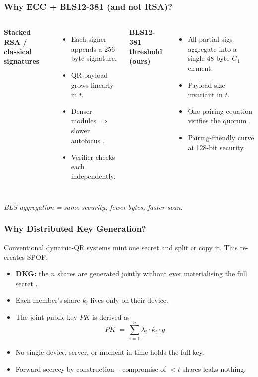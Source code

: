 \documentclass{beamer}
\newcommand{\con}[1]{\textcolor{negative}{#1}}
\newcommand{\HL}[1]{\textcolor{emphasis}{#1}}
\begin{document}
\begin{frame}
  \frametitle{Why ECC + BLS12-381 (and not RSA)?}
  \begin{columns}[T]
      \textbf{Stacked RSA / classical signatures}
      \begin{itemize}
        \item Each signer appends a 256-byte signature.
        \item QR payload grows \con{linearly} in $t$.
        \item Denser modules $\Rightarrow$ slower autofocus \cite{corpuz2025}.
        \item Verifier checks each independently.
      \end{itemize}
      \textbf{BLS12-381 threshold (ours)}
      \begin{itemize}
        \item All partial sigs aggregate into a \HL{single 48-byte $G_1$ element}.
        \item Payload size \HL{invariant in $t$}.
        \item One pairing equation verifies the quorum \cite{boneh2001}.
        \item Pairing-friendly curve at 128-bit security.
      \end{itemize}
  \end{columns}
  \vspace{0.15cm}
  \textit{BLS aggregation = same security, fewer bytes, faster scan.}
\end{frame}

\begin{frame}
  \frametitle{Why Distributed Key Generation?}
  Conventional dynamic-QR systems mint one secret and split or copy it. This \con{re-creates SPOF}.
  \vspace{0.2cm}
  \begin{itemize}
    \item \textbf{DKG:} the $n$ shares are generated jointly without ever materialising the full secret \cite{gennaro2007}.
    \item Each member's share $k_i$ lives only on their device.
    \item The joint public key $PK$ is derived as
      \[
      PK \;=\; \sum_{i=1}^{n} \lambda_i \cdot k_i \cdot g
      \]
    \item No single device, server, or moment in time holds the full key.
    \item Forward secrecy \HL{by construction} -- compromise of $< t$ shares leaks nothing.
  \end{itemize}
\end{frame}
\end{document}
